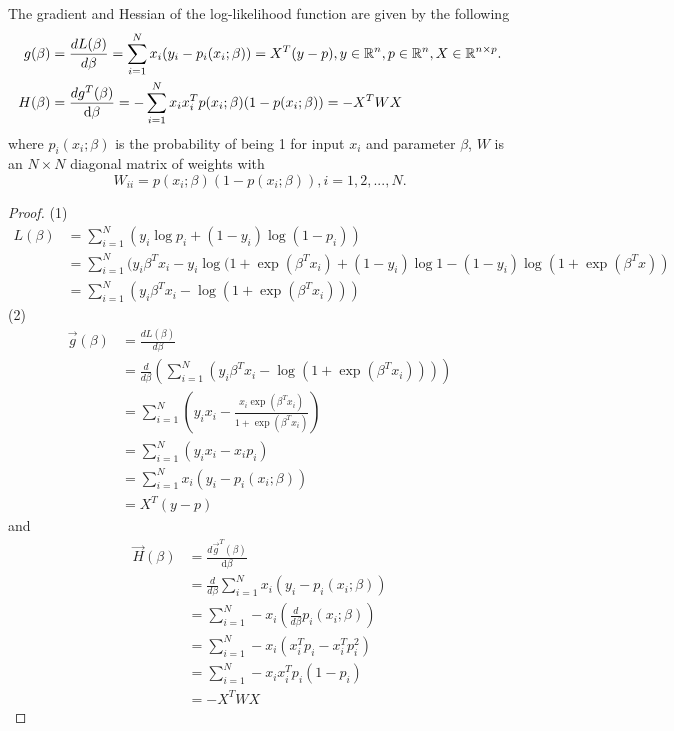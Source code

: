 \begin{refsection}
\begin{lemma}
	The gradient and Hessian of the log-likelihood function are given by the following
	\begin{align*}
	g(\beta) &= \frac{d L(\beta)}{d \beta} = \sum\limits_{i=1}^N x_i(y_i - p_i(x_i;\beta))  = X^T(y - p), y\in \mathbb{R}^n, p\in \mathbb{R}^n, X\in \mathbb{R}^{n\times p}.\\
	H(\beta) &= \frac{d g^T(\beta)}{\mathrm{d} \beta}= -\sum_{i=1}^{N} x_ix_i^T p(x_i;\beta)(1-p(x_i;\beta)) = -X^TWX
	\end{align*}
	where $p_i(x_i;\beta)$ is the probability of being 1 for input $x_i$ and parameter $\beta$, $W$ is an $N\times N$ diagonal matrix of weights with 
	$$W_{ii} = p(x_i;\beta)(1 - p(x_i;\beta)),i=1,2,...,N.$$
\end{lemma}
\begin{proof}
	(1)	
	\begin{align*}
	L(\beta) &= \sum_{i=1}^{N}(y_i\log p_i + (1- y_i)\log(1-p_i)) \\
	&=\sum_{i=1}^{N} (y_i\beta^Tx_i - y_i \log(1 + \exp(\beta^T x_i) + (1-y_i)\log 1 - (1-y_i)\log(1 + \exp(\beta^Tx))\\
	&=\sum_{i=1}^{N} (y_i\beta^Tx_i - \log(1 + \exp(\beta^Tx_i)))
	\end{align*}	
	(2)
	\begin{align}
	\vec{g}(\beta) &= \frac{d L(\beta)}{d \beta} \\
	&= \frac{d}{d\beta}(\sum_{i=1}^{N} (y_i\beta^Tx_i - \log(1 + \exp(\beta^Tx_i))))\\
	&=\sum_{i=1}^{N} (y_ix_i - \frac{x_i \exp(\beta^Tx_i)}{1 + \exp(\beta^Tx_i)})\\
	&=\sum_{i=1}^{N} (y_ix_i - x_ip_i) \\
	&= \sum\limits_{i=1}^N x_i(y_i - p_i(x_i;\beta)) \\
	& = X^T(y - p)
	\end{align}
	and
	\begin{align}
	\vec{H}(\beta) &= \frac{d \vec{g}^T(\beta)}{\mathrm{d} \beta} \\
	&=\frac{d}{d\beta} \sum\limits_{i=1}^N x_i(y_i - p_i(x_i;\beta))\\
	&=  \sum\limits_{i=1}^N -x_i(\frac{d}{d\beta} p_i(x_i;\beta))\\
	&=  \sum\limits_{i=1}^N -x_i(x_i^Tp_i - x_i^Tp_i^2)\\
	&= \sum_{i=1}^{N} -x_ix_i^Tp_i(1-p_i) \\
	& = -X^TWX
	\end{align}
\end{proof}




\end{refsection}
